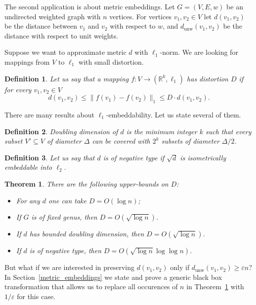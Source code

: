 \documentclass{article}
\newcommand{\dunw}{d_{\mathrm{unw}}}
\newcommand{\eps}{\varepsilon}
\newtheorem{definition}{Definition}
\newtheorem{theorem}{Theorem}
\begin{document}
    The second application is about metric embeddings.
    Let $G = (V, E, w)$ be an undirected weighted graph with $n$ vertices.
    For vertices $v_1, v_2 \in V$ let $d(v_1, v_2)$ be the distance between $v_1$ and $v_2$ with respect to $w$,
    and $\dunw(v_1, v_2)$ be the distance with respect to unit weights.

    Suppose we want to approximate metric $d$ with $\ell_1$-norm. We are looking for mappings from $V$ to $\ell_1$ with small distortion. 
    \begin{definition}
        Let us say that a mapping $f \colon V \to (\mathbb{R}^k, \ell_1)$ has distortion $D$ if for every $v_1, v_2 \in V$
        $$
            d(v_1, v_2) \leq \|f(v_1) - f(v_2)\|_1 \leq D \cdot d(v_1, v_2).
        $$
    \end{definition}

    There are many results about $\ell_1$-embeddability. Let us state several of them.

    \begin{definition}
        Doubling dimension of $d$ is the minimum integer $k$ such that every subset $V' \subseteq V$ of diameter $\Delta$
        can be covered with $2^k$ subsets of diameter $\Delta / 2$.
    \end{definition}

    \begin{definition}
        Let us say that $d$ is of negative type if $\sqrt{d}$ is isometrically embeddable into $\ell_2$.
    \end{definition}

    \begin{theorem}
        \label{l1_embeddings}
        There are the following upper-bounds on $D$:
        \begin{itemize}
            \item \cite{B85} For any $d$ one can take $D = O(\log n)$;
            \item \cite{R99, IS07} If $G$ is of fixed genus, then $D = O(\sqrt{\log n})$. 
            \item \cite{GKL03} If $d$ has bounded doubling dimension, then $D = O(\sqrt{\log n})$.
            \item \cite{ALN05} If $d$ is of negative type, then $D = O(\sqrt{\log n} \log \log n)$. 
        \end{itemize}
    \end{theorem}

    But what if we are interested in preserving $d(v_1, v_2)$ only if $\dunw(v_1, v_2) \geq \eps n$?
    In Section~\ref{metric_embeddings} we state and prove a generic black box transformation
    that allows us to replace all occurences of $n$ in Theorem~\ref{l1_embeddings} with $1 / \eps$ for this case.
\end{document}
